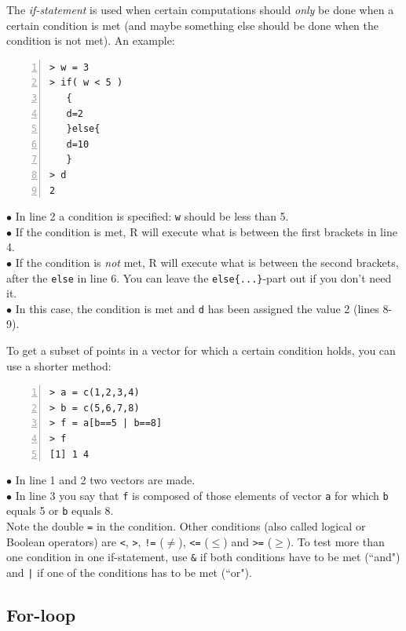 \documentclass[a4paper,11pt,twocolumn,tablecaptionabove]{scrartcl} %
\begin{document}
The \emph{if-statement} is used when certain computations should \emph{only} be done when a certain condition is met (and maybe something else should be done when the condition is not met). An example:

\begin{Verbatim}[frame=single,numbers=left,gobble=0, xleftmargin=0.35cm, numbersep=0.1cm]
> w = 3
> if( w < 5 )
   {
   d=2
   }else{
   d=10
   }
> d
2
\end{Verbatim}

\noindent $\bullet$ In line 2 a condition is specified: \texttt{w} should be less than 5.\\
\noindent $\bullet$ If the condition is met, R will execute what is between the first brackets in line 4.\\
\noindent $\bullet$ If the condition is \emph{not} met, R will execute what is between the second brackets, after the \texttt{else} in line 6. You can leave the \verb!else{...}!-part out if you don't need it.\\
\noindent $\bullet$ In this case, the condition is met and \texttt{d} has been assigned the value 2 (lines 8-9).

To get a subset of points in a vector for which a certain condition holds, you can use a shorter method:

\begin{Verbatim}[frame=single,numbers=left,gobble=0, xleftmargin=0.35cm, numbersep=0.1cm]
> a = c(1,2,3,4)
> b = c(5,6,7,8)
> f = a[b==5 | b==8]
> f
[1] 1 4
\end{Verbatim}

\noindent $\bullet$ In line 1 and 2 two vectors are made.\\
\noindent $\bullet$ In line 3 you say that \texttt{f} is composed of those elements of vector \texttt{a} for which \texttt{b} equals 5 or \texttt{b} equals 8. \\

Note the double \texttt{=} in the condition. Other conditions (also called logical or Boolean operators) are \texttt{<}, \texttt{>}, \texttt{!=} ($\neq$), \texttt{<=} ($\leq$) and \texttt{>=} ($\geq$). To test more than one condition in one if-statement, use \texttt{\&} if both conditions have to be met (``and") and \texttt{|} if one of the conditions has to be met (``or").

\subsection{For-loop}
\end{document}
